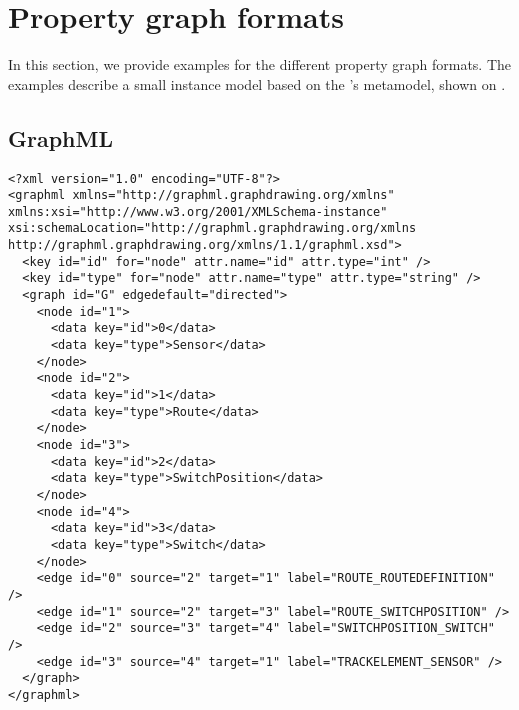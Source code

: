 \appendix

\chapter{Property graph formats}

\label{sec:property-graph-formats}

In this section, we provide examples for the different property graph formats. The examples describe a small instance model based on the \tb{}'s metamodel, shown on .


\section{GraphML}

\lstset{language=XML,breaklines=true}
\begin{lstlisting}[caption=A graph based on the \tb{}'s metamodel stored in \graphml{} format]
<?xml version="1.0" encoding="UTF-8"?>
<graphml xmlns="http://graphml.graphdrawing.org/xmlns" xmlns:xsi="http://www.w3.org/2001/XMLSchema-instance" xsi:schemaLocation="http://graphml.graphdrawing.org/xmlns http://graphml.graphdrawing.org/xmlns/1.1/graphml.xsd">
  <key id="id" for="node" attr.name="id" attr.type="int" />
  <key id="type" for="node" attr.name="type" attr.type="string" />
  <graph id="G" edgedefault="directed">
    <node id="1">
      <data key="id">0</data>
      <data key="type">Sensor</data>
    </node>
    <node id="2">
      <data key="id">1</data>
      <data key="type">Route</data>
    </node>
    <node id="3">
      <data key="id">2</data>
      <data key="type">SwitchPosition</data>
    </node>
    <node id="4">
      <data key="id">3</data>
      <data key="type">Switch</data>
    </node>
    <edge id="0" source="2" target="1" label="ROUTE_ROUTEDEFINITION" />
    <edge id="1" source="2" target="3" label="ROUTE_SWITCHPOSITION" />
    <edge id="2" source="3" target="4" label="SWITCHPOSITION_SWITCH" />
    <edge id="3" source="4" target="1" label="TRACKELEMENT_SENSOR" />
  </graph>
</graphml>
\end{lstlisting}

